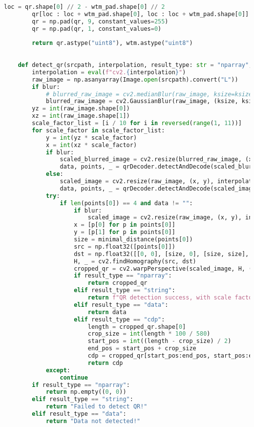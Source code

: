 \begin{lstlisting}[language=Python]
        loc = qr.shape[0] // 2 - wtm_pad.shape[0] // 2
        qr[loc : loc + wtm_pad.shape[0], loc : loc + wtm_pad.shape[0]] = wtm_pad
        qr = np.pad(qr, 9, constant_values=255)
        qr = np.pad(qr, 1, constant_values=0)
    
        return qr.astype("uint8"), wtm.astype("uint8")
    
    
    def detect_qr(srcpath, interpolation, result_type: str = "nparray", blur: bool = True, ksize: int = 7):
        interpolation = eval(f"cv2.{interpolation}")
        raw_image = np.asanyarray(Image.open(srcpath).convert("L"))
        if blur:
            # blurred_raw_image = cv2.medianBlur(raw_image, ksize=ksize)
            blurred_raw_image = cv2.GaussianBlur(raw_image, (ksize, ksize), 0)
        yz = int(raw_image.shape[0])
        xz = int(raw_image.shape[1])
        scale_factor_list = [i / 10 for i in reversed(range(1, 11))]
        for scale_factor in scale_factor_list:
            y = int(yz * scale_factor)
            x = int(xz * scale_factor)
            if blur:
                scaled_blurred_image = cv2.resize(blurred_raw_image, (x, y), interpolation=interpolation)
                data, points, _ = qrDecoder.detectAndDecode(scaled_blurred_image)
            else:
                scaled_image = cv2.resize(raw_image, (x, y), interpolation=interpolation)
                data, points, _ = qrDecoder.detectAndDecode(scaled_image)
            try:
                if len(points[0]) == 4 and data != "":
                    if blur:
                        scaled_image = cv2.resize(raw_image, (x, y), interpolation=interpolation)
                    x = [p[0] for p in points[0]]
                    y = [p[1] for p in points[0]]
                    size = minimal_distance(points[0])
                    src = np.float32([points[0]])
                    dst = np.float32([[0, 0], [size, 0], [size, size], [0, size]])
                    H, _ = cv2.findHomography(src, dst)
                    cropped_qr = cv2.warpPerspective(scaled_image, H, (size, size))
                    if result_type == "nparray":
                        return cropped_qr
                    elif result_type == "string":
                        return f"QR detection success, with scale factor: {scale_factor}!"
                    elif result_type == "data":
                        return data
                    elif result_type == "cdp":
                        length = cropped_qr.shape[0]
                        crop_size = int(length * 100 / 580)
                        start_pos = int((length - crop_size) / 2)
                        end_pos = start_pos + crop_size
                        cdp = cropped_qr[start_pos:end_pos, start_pos:end_pos]
                        return cdp
            except:
                continue
        if result_type == "nparray":
            return np.empty((0, 0))
        elif result_type == "string":
            return "Failed to detect QR!"
        elif result_type == "data":
            return "Data not detected!"
    

\end{lstlisting}
